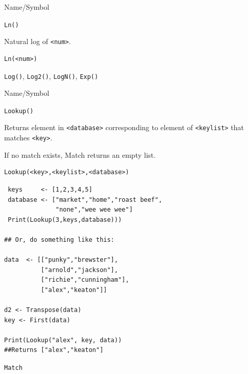 \begin{desc}{Name/Symbol}
\item[Name/Symbol]	\verb+Ln()+

\item[Description]	Natural log of \verb+<num>+.

\item[Usage]		
\begin{verbatim}
Ln(<num>)
\end{verbatim}

\item[Example]	

\item[See Also]	\verb+Log()+, \verb+Log2()+, \verb+LogN()+, \verb+Exp()+     
\end{desc}





\begin{desc}{Name/Symbol}
\item[Name/Symbol]	\verb+Lookup()+

\item[Description] Returns
element in \verb+<database>+ corresponding to element of
\verb+<keylist>+ that matches \verb+<key>+.

If no match exists, Match returns an empty list.
\item[Usage]		
\begin{verbatim}
Lookup(<key>,<keylist>,<database>)
\end{verbatim}

\item[Example]	

\begin{verbatim}
 keys     <- [1,2,3,4,5]
 database <- ["market","home","roast beef",
              "none","wee wee wee"]
 Print(Lookup(3,keys,database))) 

## Or, do something like this:
  
data  <- [["punky","brewster"],
          ["arnold","jackson"],
          ["richie","cunningham"],
          ["alex","keaton"]]

d2 <- Transpose(data)
key <- First(data)

Print(Lookup("alex", key, data))
##Returns ["alex","keaton"]
\end{verbatim}
\item[See Also]	\verb+Match+
\end{desc}

